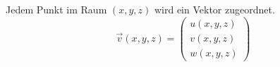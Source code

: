 Jedem Punkt im Raum $(x,y,z)$ wird ein Vektor zugeordnet.
$$
    \vec{v}(x,y,z) = \begin{pmatrix}
        u(x,y,z)\\v(x,y,z)\\w(x,y,z)
    \end{pmatrix}
$$